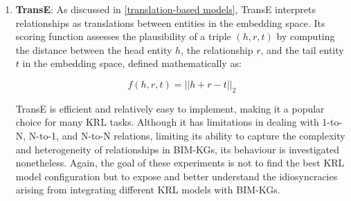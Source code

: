 \begin{enumerate}
    \item 
    \textbf{TransE}: 
    As discussed in \autoref{translation-based models}, TransE interprets relationships as translations between entities in the embedding space. Its scoring function assesses the plausibility of a triple $(h, r, t)$ by computing the distance between the head entity \(h\), the relationship \(r\), and the tail entity \(t\) in the embedding space, defined mathematically as:
    
    \begin{equation}
        f(h, r, t) = ||h + r - t||_2
    \end{equation}
    
    TransE is efficient and relatively easy to implement, making it a popular choice for many \ac{KRL} tasks. Although it has limitations in dealing with 1-to-N, N-to-1, and N-to-N relations, limiting its ability to capture the complexity and heterogeneity of relationships in \acp{BIM-KG}, its behaviour is investigated nonetheless. Again, the goal of these experiments is not to find the best \ac{KRL} model configuration but to expose and better understand the idiosyncracies arising from integrating different \ac{KRL} models with \acp{BIM-KG}.


\end{enumerate}
